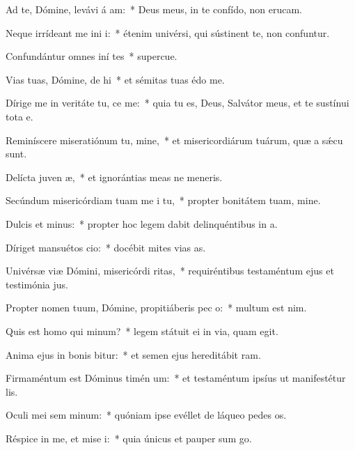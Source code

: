 \item Ad te, Dómine, levávi á am:~* Deus meus, in te confído, non erucam.
\item Neque irrídeant me ini i:~* étenim univérsi, qui sústinent te, non confuntur.
\item Confundántur omnes iní tes~* supercue.
\item Vias tuas, Dómine, de hi~* et sémitas tuas édo me.
\item Dírige me in veritáte tu,  ce me:~* quia tu es, Deus, Salvátor meus, et te sustínui tota e.
\item Reminíscere miseratiónum tu, mine,~* et misericordiárum tuárum, quæ a sǽcu sunt.
\item Delícta juven æ,~* et ignorántias meas ne meneris.
\item Secúndum misericórdiam tuam me i tu,~* propter bonitátem tuam, mine.
\item Dulcis et  minus:~* propter hoc legem dabit delinquéntibus in a.
\item Díriget mansuétos  cio:~* docébit mites vias as.
\item Univérsæ viæ Dómini, misericórdi  ritas,~* requiréntibus testaméntum ejus et testimónia jus.
\item Propter nomen tuum, Dómine, propitiáberis pec o:~* multum est nim.
\item Quis est homo qui  minum?~* legem státuit ei in via, quam egit.
\item Anima ejus in bonis bitur:~* et semen ejus hereditábit ram.
\item Firmaméntum est Dóminus timén um:~* et testaméntum ipsíus ut manifestétur lis.
\item Oculi mei sem  minum:~* quóniam ipse evéllet de láqueo pedes os.
\item Réspice in me, et mise i:~* quia únicus et pauper sum go.

